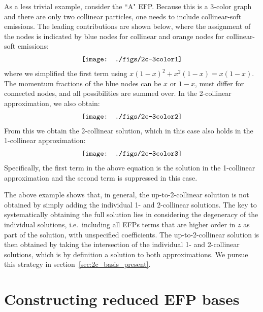 \documentclass[a4paper,11pt]{article}
\renewcommand{\sec}[1]{section~\ref{sec:#1}}
\begin{document}
As a less trivial example, consider the ``A" EFP.
%
Because this is a 3-color graph and there are only two collinear particles, one needs to include collinear-soft emissions.
%
The leading contributions are shown below, where the assignment of the nodes is indicated by blue nodes for collinear and orange nodes for collinear-soft emissions:
\begin{align}
 \texttt{[image: ./figs/2c-3color1]} \raisetag{1.8\baselineskip}    
\end{align}
where we simplified the first term using $x (1-x)^2 + x^2(1-x) =x(1-x)$.
%
The momentum fractions of the blue nodes can be $x$ or $1-x$, must differ for connected nodes, and all possibilities are summed over.
%
In the 2-collinear approximation, we also obtain:
\begin{align}
 \texttt{[image: ./figs/2c-3color2]} \raisetag{1.7\baselineskip}    
\end{align}
From this we obtain the 2-collinear solution, which in this case also holds in the 1-collinear approximation:
\begin{align} \label{eq:ANLL}
 \texttt{[image: ./figs/2c-3color3]} \raisetag{4.7\baselineskip}   
\end{align}
Specifically, the first term in the above equation is the solution in the 1-collinear approximation and the second term is suppressed in this case.


The above example shows that, in general, the up-to-2-collinear solution is not obtained by simply adding the individual 1- and 2-collinear solutions.
%
The key to systematically obtaining the full solution lies in considering the degeneracy of the individual solutions, i.e.~including all EFPs terms that are higher order in $z$ as part of the solution, with unspecified coefficients.
%
The up-to-2-collinear solution is then obtained by taking the intersection of the individual 1- and 2-collinear solutions, which is by definition a solution to both approximations.
%
We pursue this strategy in \sec{2c_basis_present}.


\section{Constructing reduced EFP bases}
\label{sec:bases}
\end{document}

